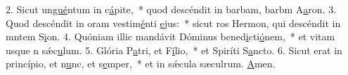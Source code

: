 2. Sicut un\uline{gué}ntum in c\uline{á}pite,~* quod descéndit in barbam, barbm A\uline{a}ron.
3. Quod descéndit in oram vestim\uline{é}nti \uline{e}jus:~* sicut ros Hermon, qui descéndit in mntem S\uline{i}on.
4. Quóniam illic mandávit Dóminus bened\uline{i}cti\uline{ó}nem,~* et vitam usque n sǽc\uline{u}lum.
5. Glória P\uline{a}tri, et F\uline{í}lio,~* et Spiríti S\uline{a}ncto.
6. Sicut erat in princípio, et n\uline{u}nc, et s\uline{e}mper,~* et in sǽcula sæculrum. \uline{A}men.
